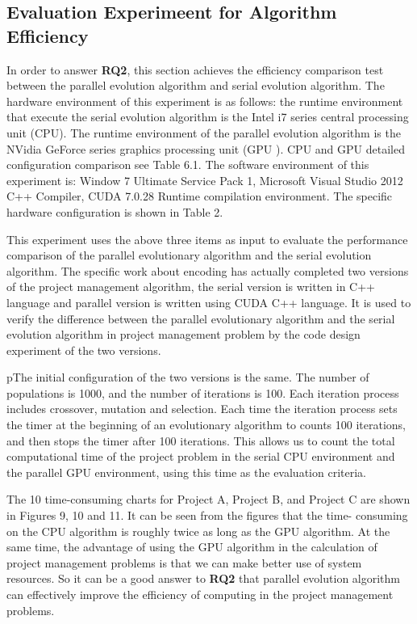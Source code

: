 \subsection{Evaluation Experimeent for Algorithm Efficiency}
%
In order to answer \textbf{RQ2}, this section achieves the efficiency comparison
test between the parallel evolution algorithm and serial evolution
algorithm. The hardware environment of this experiment is as follows: the
runtime environment that execute the serial evolution algorithm is the Intel i7
series central processing unit (CPU). The runtime environment of the parallel
evolution algorithm is the NVidia GeForce series graphics processing unit (GPU
). CPU and GPU detailed configuration comparison see Table 6.1. The software
environment of this experiment is: Window 7 Ultimate Service Pack 1, Microsoft
Visual Studio 2012 C++ Compiler, CUDA 7.0.28 Runtime compilation
environment. The specific hardware configuration is shown in Table 2.


This experiment uses the above three items as input to evaluate the performance
comparison of the parallel evolutionary algorithm and the serial evolution
algorithm. The specific work about encoding has actually completed two versions
of the project management algorithm, the serial version is written in C++
language and parallel version is written using CUDA C++ language. It is used to
verify the difference between the parallel evolutionary algorithm and the serial
evolution algorithm in project management problem by the code design experiment
of the two versions.


pThe initial configuration of the two versions is the same. The number of
populations is 1000, and the number of iterations is 100. Each iteration process
includes crossover, mutation and selection.  Each time the iteration process
sets the timer at the beginning of an evolutionary algorithm to counts 100
iterations, and then stops the timer after 100 iterations. This allows us to
count the total computational time of the project problem in the serial CPU
environment and the parallel GPU environment, using this time as the evaluation
criteria.


The 10 time-consuming charts for Project A, Project B, and Project C are 
shown in Figures 9, 10 and 11. It can be seen from the figures that the time-
consuming on the CPU algorithm is roughly twice as long as the GPU algorithm. 
At the same time, the advantage of using the GPU algorithm in the calculation 
of project management problems is that we can make better use of system 
resources. So it can be a good answer to \textbf{RQ2} that parallel evolution 
algorithm can effectively improve the efficiency of computing in the project 
management problems.
